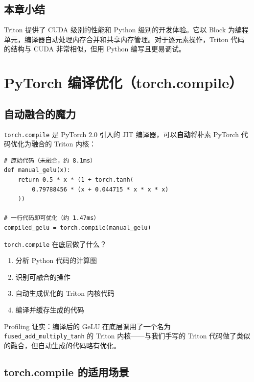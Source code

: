 \documentclass[a4paper]{article}
\begin{document}
\subsection{本章小结}

Triton 提供了 CUDA 级别的性能和 Python 级别的开发体验。它以 Block 为编程单元，编译器自动处理内存合并和共享内存管理。对于逐元素操作，Triton 代码的结构与 CUDA 非常相似，但用 Python 编写且更易调试。


\section{PyTorch 编译优化（torch.compile）}

\subsection{自动融合的魔力}

\texttt{torch.compile} 是 PyTorch 2.0 引入的 JIT 编译器，可以\textbf{自动}将朴素 PyTorch 代码优化为融合的 Triton 内核：

\begin{lstlisting}[caption={torch.compile 使用示例}]
# 原始代码（未融合，约 8.1ms）
def manual_gelu(x):
    return 0.5 * x * (1 + torch.tanh(
        0.79788456 * (x + 0.044715 * x * x * x)
    ))

# 一行代码即可优化（约 1.47ms）
compiled_gelu = torch.compile(manual_gelu)
\end{lstlisting}

\texttt{torch.compile} 在底层做了什么？
\begin{enumerate}
    \item 分析 Python 代码的计算图
    \item 识别可融合的操作
    \item 自动生成优化的 Triton 内核代码
    \item 编译并缓存生成的代码
\end{enumerate}

Profiling 证实：编译后的 GeLU 在底层调用了一个名为 \texttt{fused\_add\_multiply\_tanh} 的 Triton 内核——与我们手写的 Triton 代码做了类似的融合，但自动生成的代码略有优化。

\subsection{torch.compile 的适用场景}
\end{document}

